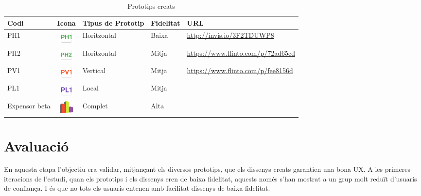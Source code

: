 \begin{table}
\caption{Prototips creats}
\label{table:prototypes}
\begin{tabular}{ | p{1.6cm} | c | p{1.9cm} | l | l |}
\hline
\textbf{Codi} & \textbf{Icona} & \textbf{Tipus de Prototip} & \textbf{Fidelitat} & \textbf{URL}\\ 
\hline
PH1 & \includegraphics[width=0.7cm]{PH1.png} & Horitzontal & Baixa & \href{http://invis.io/3F2TDUWP8}{http://invis.io/3F2TDUWP8} \\
\hline
PH2 & \includegraphics[width=0.7cm]{PH2.png} & Horitzontal & Mitja & \href{https://www.flinto.com/p/72ad65cd}{https://www.flinto.com/p/72ad65cd} \\
\hline
PV1 & \includegraphics[width=0.7cm]{PV1.png} & Vertical & Mitja & \href{https://www.flinto.com/p/fee8156d}{https://www.flinto.com/p/fee8156d} \\
\hline
PL1 & \includegraphics[width=0.7cm]{PL1.png} & Local & Mitja &  \\ %
\hline
Expensor beta & \includegraphics[width=0.7cm]{logo.png} & Complet & Alta &  \\ %
\hline
\end{tabular}
\end{table}

\section{Avaluació}
En aquesta etapa l'objectiu era validar, mitjançant els diversos prototips, que els dissenys creats garantien una bona \ac{UX}. A les primeres iteracions de l'estudi, quan els prototips i els dissenys eren de baixa fidelitat, aquests només s'han mostrat a un grup molt reduït d'usuaris de confiança. I és que no tots els usuaris entenen amb facilitat dissenys de baixa fidelitat.

